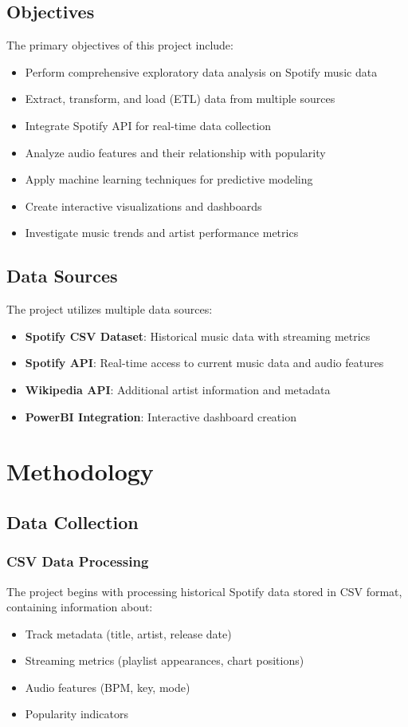 \documentclass[12pt,a4paper]{article}
\begin{document}
\subsection{Objectives}
The primary objectives of this project include:
\begin{itemize}
    \item Perform comprehensive exploratory data analysis on Spotify music data
    \item Extract, transform, and load (ETL) data from multiple sources
    \item Integrate Spotify API for real-time data collection
    \item Analyze audio features and their relationship with popularity
    \item Apply machine learning techniques for predictive modeling
    \item Create interactive visualizations and dashboards
    \item Investigate music trends and artist performance metrics
\end{itemize}

\subsection{Data Sources}
The project utilizes multiple data sources:
\begin{itemize}
    \item \textbf{Spotify CSV Dataset}: Historical music data with streaming metrics
    \item \textbf{Spotify API}: Real-time access to current music data and audio features
    \item \textbf{Wikipedia API}: Additional artist information and metadata
    \item \textbf{PowerBI Integration}: Interactive dashboard creation
\end{itemize}

\section{Methodology}

\subsection{Data Collection}
\subsubsection{CSV Data Processing}
The project begins with processing historical Spotify data stored in CSV format, containing information about:
\begin{itemize}
    \item Track metadata (title, artist, release date)
    \item Streaming metrics (playlist appearances, chart positions)
    \item Audio features (BPM, key, mode)
    \item Popularity indicators
\end{itemize}
\end{document}

